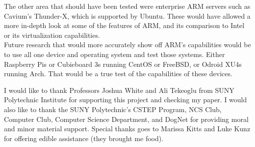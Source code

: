 \documentclass[12pt]{spieman}  %
\begin{document}
The other area that should have been tested were enterprise ARM servers such as Cavium's Thunder-X, which is supported by Ubuntu. These would have allowed a more in-depth look at some of the features of ARM, and its comparison to Intel or its virtualization capabilities.\\

Future research that would more accurately show off ARM's capabilities would be to use all one device and operating system and test those systems. Either Raspberry Pis or Cubieboard 3s running CentOS or FreeBSD, or Odroid XU4s running Arch. That would be a true test of the capabilities of these devices.



\appendix
\acknowledgments 
I would like to thank Professors Joshua White and Ali Tekeoglu from SUNY Polytechnic Institute for supporting this project and checking my paper. I would also like to thank the SUNY Polytechnic's CSTEP Program, NCS Club, Computer Club, Computer Science Department, and DogNet for providing moral and minor material support. Special thanks goes to Marissa Kitts and Luke Kunz for offering edible assistance (they brought me food).


\end{document}
